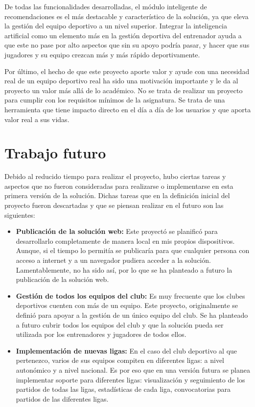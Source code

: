 De todas las funcionalidades desarrolladas, el módulo inteligente de recomendaciones es el más destacable y característico de la solución, ya que eleva la gestión del equipo deportivo a un nivel superior. Integrar la inteligencia artificial como un elemento más en la gestión deportiva del entrenador ayuda a que este no pase por alto aspectos que sin su apoyo podría pasar, y hacer que sus jugadores y su equipo crezcan más y más rápido deportivamente.

Por último, el hecho de que este proyecto aporte valor y ayude con una necesidad real de un equipo deportivo real ha sido una motivación importante y le da al proyecto un valor más allá de lo académico. No se trata de realizar un proyecto para cumplir con los requisitos mínimos de la asignatura. Se trata de una herramienta que tiene impacto directo en el día a día de los usuarios y que aporta valor real a sus vidas.

\section{Trabajo futuro}

Debido al reducido tiempo para realizar el proyecto, hubo ciertas tareas y aspectos que no fueron consideradas para realizarse o implementarse en esta primera versión de la solución. Dichas tareas que en la definición inicial del proyecto fueron descartadas y que se piensan realizar en el futuro son las siguientes:

\begin{itemize}
  \item \textbf{Publicación de la solución web:} Este proyectó se planificó para desarrollarlo completamente de manera local en mis propios dispositivos. Aunque, si el tiempo lo permitía se publicaría para que cualquier persona con acceso a internet y a un navegador pudiera acceder a la solución. Lamentablemente, no ha sido así, por lo que se ha planteado a futuro la publicación de la solución web.
  \item \textbf{Gestión de todos los equipos del club:} Es muy frecuente que los clubes deportivos cuenten con más de un equipo. Este proyecto, originalmente se definió para apoyar a la gestión de un único equipo del club. Se ha planteado a futuro cubrir todos los equipos del club y que la solución pueda ser utilizada por los entrenadores y jugadores de todos ellos.
  \item \textbf{Implementación de nuevas ligas:} En el caso del club deportivo al que pertenezco, varios de sus equipos compiten en diferentes ligas: a nivel autonómico y a nivel nacional. Es por eso que en una versión futura se planea implementar soporte para diferentes ligas: visualización y seguimiento de los partidos de todas las ligas, estadísticas de cada liga, convocatorias para partidos de las diferentes ligas.
\end{itemize}

